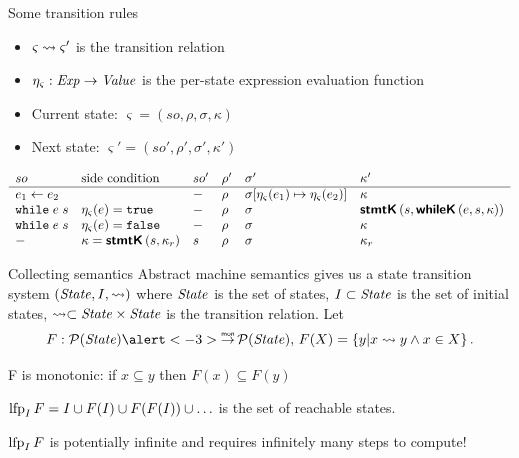 \documentclass[aspectratio=169]{beamer}
\begin{document}
\begin{frame}{Some transition rules}
  \small
  \begin{itemize}
  \item $\varsigma \rightsquigarrow \varsigma'$ is the transition relation%
  \item \(\eta_\varsigma : \mathit{Exp} \to \mathit{Value} \) is the per-state expression evaluation function
\item Current state: \(\varsigma = (so, \rho, \sigma, \kappa) \)
\item Next state: \( \varsigma' = (so', \rho', \sigma', \kappa') \) \pause
  \end{itemize}
  \footnotesize
  \[
  \begin{array}{llllll}
    so & \text{side condition} & so' & \rho' & \sigma' & {\kappa}' \\ \hline
    e_1 \leftarrow e_2 & & - & \rho & \sigma[\eta_\varsigma(e_1) \mapsto \eta_\varsigma(e_2)] & {\kappa} \\
    \texttt{while}\; e\; s & \eta_\varsigma(e) = \texttt{true} & - & \rho & \sigma & \textsf{\textbf{stmtK}}\,(s, \textsf{\textbf{whileK}}\,(e, s,\kappa)) \\
    \texttt{while}\; e\; s & \eta_\varsigma(e) = \texttt{false} & - & \rho & \sigma & {\kappa} \\
    - & \kappa = \textsf{\textbf{stmtK}}\,(s,\kappa_r) & s & \rho & \sigma & {\kappa_r}
  \end{array}
  \]
\end{frame}

\begin{frame}{Collecting semantics}
  Abstract machine semantics gives us a state transition system $(\mathit{State}, I, \rightsquigarrow)$ where $\mathit{State}$ is the set of states, $I \subset \mathit{State}$ is the set of initial states, $\rightsquigarrow \subset \mathit{State} \times \mathit{State}$ is the transition relation. \pause Let
  \[ F : \pw(\State) \alert<-3>{\monarrow} \pw(\State),\, F(X) = \Set{y \vert x \step y \wedge x \in X}. \]\pause

  F is monotonic: if $x \subseteq y$ then $F(x) \subseteq F(y)$
  
  $\operatorname{lfp}_I F = I \cup F(I) \cup F(F(I)) \cup \ldots $ is the set of reachable states.\pause

  \alert{$\operatorname{lfp}_I F$ is potentially infinite and requires infinitely many steps to compute!}
\end{frame}
\end{document}
